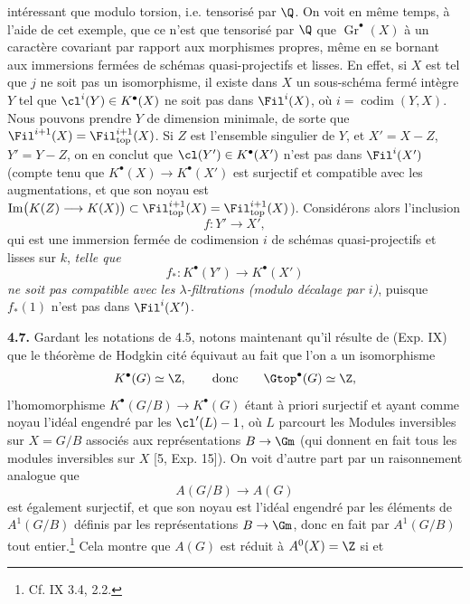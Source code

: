 intéressant que modulo torsion, i.e. tensorisé par $\Q$. On voit en même temps, à l'aide de cet exemple, que ce n'est que tensorisé par $\Q$ que $\operatorname{Gr}^\bullet(X)$ à un caractère covariant par rapport aux morphismes propres, même en se bornant aux immersions fermées de schémas quasi-projectifs et lisses. En effet, si $X$ est tel que $j$ ne soit pas un isomorphisme, il existe dans $X$ un sous-schéma fermé intègre $Y$ tel que $\cl^i(Y)\in K^\bullet(X)$ ne soit pas dans $\Fil^i(X)$, où $i=\operatorname{codim}(Y,X)$. Nous pouvons prendre $Y$ de dimension minimale, de sorte que $\Fil^{i+1}(X)=\Fil_{\mathrm{top}}^{i+1}(X)$. Si $Z$ est l'ensemble singulier de $Y$, et $X'=X-Z$, $Y'=Y-Z$, on en conclut que $\cl(Y')\in K^\bullet(X')$ n'est pas dans $\Fil^i(X')$ (compte tenu que $K^\bullet(X)\to K^\bullet(X')$ est surjectif et compatible avec les augmentations, et que son noyau est $\operatorname{Im}\bigl(K(Z)\longrightarrow K(X)\bigr)\subset\Fil_{\mathrm{top}}^{i+1}(X)=\Fil_{\mathrm{top}}^{i+1}(X)$). Considérons alors l'inclusion
\[
 f:Y'\longrightarrow X',
\]
qui est une immersion fermée de codimension $i$ de schémas quasi-projectifs et lisses sur $k$, \emph{telle que}
\[
 f_*:K^\bullet(Y')\longrightarrow K^\bullet(X')
\]
\emph{ne soit pas compatible avec les $\lambda$-filtrations (modulo décalage par $i$)}, puisque $f_*(1)$ n'est pas dans $\Fil^i(X')$.

\textbf{4.7.} Gardant les notations de 4.5, notons maintenant qu'il résulte de (Exp. IX) que le théorème de Hodgkin cité équivaut au fait que l'on a un isomorphisme
\[
 K^\bullet(G)\simeq\Z,\qquad\text{donc}\qquad \Gtop^\bullet(G)\simeq\Z,
\]
l'homomorphisme $K^\bullet(G/B)\to K^\bullet(G)$ étant à priori surjectif et ayant comme noyau l'idéal engendré par les $\cl'(L)-1$, où $L$ parcourt les Modules inversibles sur $X=G/B$ associés aux représentations $B\to\Gm$ (qui donnent en fait tous les modules inversibles sur $X$ [5, Exp. 15]). On voit d'autre part par un raisonnement analogue que
\[
 A(G/B)\longrightarrow A(G)
\]
est également surjectif, et que son noyau est l'idéal engendré par les éléments de $A^1(G/B)$ définis par les représentations $B\to\Gm$, donc en fait par $A^1(G/B)$ tout entier.\footnote{Cf. IX 3.4, 2.2.} Cela montre que $A(G)$ est réduit à $A^0(X)=\Z$ si et
